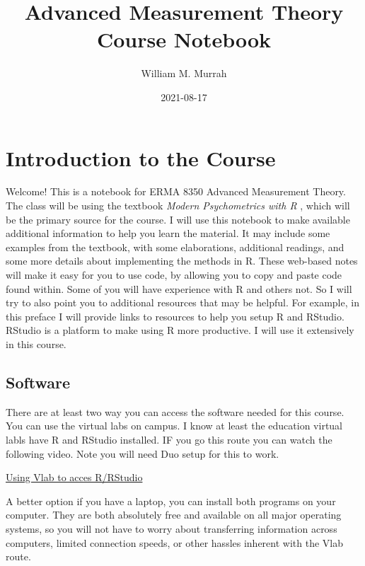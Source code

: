 \documentclass[
]{book}
\title{Advanced Measurement Theory Course Notebook}
\author{William M. Murrah}
\date{2021-08-17}
\begin{document}
\maketitle

{
\setcounter{tocdepth}{1}
\tableofcontents
}
\hypertarget{introduction-to-the-course}{%
\chapter*{Introduction to the Course}\label{introduction-to-the-course}}

Welcome!
This is a notebook for ERMA 8350 Advanced Measurement Theory.
The class will be using the textbook \emph{Modern Psychometrics with R} \citep{mair2018modern}, which will be the primary source for the course.
I will use this notebook to make available additional information to help you learn the material.
It may include some examples from the textbook, with some elaborations, additional readings, and some more details about implementing the methods in R.
These web-based notes will make it easy for you to use code, by allowing you to copy and paste code found within.
Some of you will have experience with R and others not.
So I will try to also point you to additional resources that may be helpful.
For example, in this preface I will provide links to resources to help you setup R and RStudio.
RStudio is a platform to make using R more productive.
I will use it extensively in this course.

\hypertarget{software}{%
\section*{Software}\label{software}}

There are at least two way you can access the software needed for this course.
You can use the virtual labs on campus.
I know at least the education virtual labls have R and RStudio installed.
IF you go this route you can watch the following video.
Note you will need Duo setup for this to work.

\href{https://nv.instructuremedia.com/fetch/QkFoYkIxc0hhUVNIRGFrSE1Hd3JCeWhUREdFPS0tZjk4ODFlYWEyZWFiNWQwYWYyZDk0YTZjMjljZTJlMjBkNmIwMzE5Yw.mp4}{Using Vlab to acces R/RStudio}

A better option if you have a laptop, you can install both programs on your computer.
They are both absolutely free and available on all major operating systems, so you will not have to worry about transferring information across computers, limited connection speeds, or other hassles inherent with the Vlab route.
\end{document}
